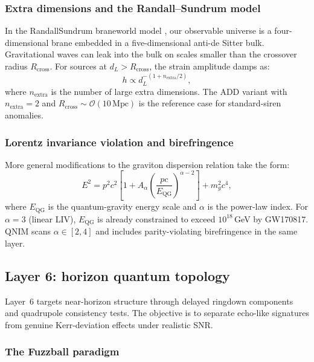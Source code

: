 \documentclass[11pt,a4paper, english]{book}
\theoremstyle{plain}
\theoremstyle{definition}
\numberwithin{equation}{chapter}
\numberwithin{figure}{chapter}
\numberwithin{table}{chapter}
\begin{document}
\subsubsection{Extra dimensions and the Randall--Sundrum model}

In the RandallSundrum braneworld model \cite{Randall_1999}, our observable
universe is a four-dimensional brane embedded in a five-dimensional anti-de
Sitter bulk.  Gravitational waves can leak into the bulk on scales smaller
than the crossover radius $R_\mathrm{cross}$.  For sources at
$d_L > R_\mathrm{cross}$, the strain amplitude damps as:
\begin{equation}
  \label{eq:rs_correction}
  h \propto d_L^{-(1+n_\mathrm{extra}/2)},
\end{equation}
where $n_\mathrm{extra}$ is the number of large extra dimensions.  The
ADD variant with $n_\mathrm{extra}=2$ and $R_\mathrm{cross}\sim\mathcal{O}(10\,\mathrm{Mpc})$ is the reference case for standard-siren anomalies.

\subsubsection{Lorentz invariance violation and birefringence}

More general modifications to the graviton dispersion relation take the form:
\begin{equation}
  \label{eq:liv_dispersion}
  E^2 = p^2c^2\left[1 + A_\alpha\!\left(\frac{pc}{E_\mathrm{QG}}\right)^{\alpha-2}
    \right] + m_g^2c^4,
\end{equation}
where $E_\mathrm{QG}$ is the quantum-gravity energy scale and $\alpha$ is
the power-law index.  For $\alpha = 3$ (linear LIV), $E_\mathrm{QG}$ is
already constrained to exceed $10^{18}$\,GeV by GW170817. QNIM scans $\alpha\in[2,4]$ and includes parity-violating birefringence in the same layer.

\subsection{Layer 6: horizon quantum topology}
\label{subsec:layer6}

Layer~6 targets near-horizon structure through delayed ringdown components and quadrupole consistency tests. The objective is to separate echo-like signatures from genuine Kerr-deviation effects under realistic SNR.

\subsubsection{The Fuzzball paradigm}
\end{document}
